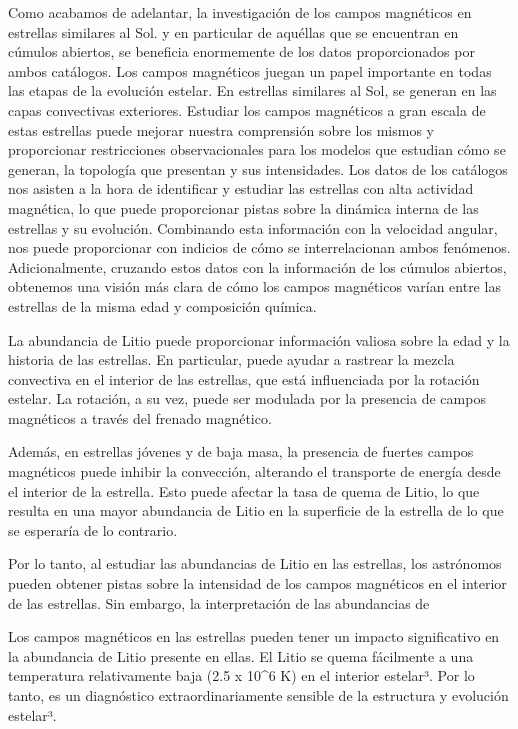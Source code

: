 Como acabamos de adelantar, la investigación de los campos magnéticos en estrellas similares al Sol. y en particular de aquéllas que se encuentran en cúmulos abiertos, se beneficia enormemente de los datos proporcionados por ambos catálogos. Los campos magnéticos juegan un papel importante en todas las etapas de la evolución estelar. En estrellas similares al Sol, se generan en las capas convectivas exteriores. Estudiar los campos magnéticos a gran escala de estas estrellas puede mejorar nuestra comprensión sobre los mismos y proporcionar restricciones observacionales para los modelos que estudian cómo se generan, la topología que presentan y sus intensidades. Los datos de los catálogos nos asisten a la hora de identificar y estudiar las estrellas con alta actividad magnética, lo que puede proporcionar pistas sobre la dinámica interna de las estrellas y su evolución. Combinando esta información con la velocidad angular, nos puede proporcionar con indicios de cómo se interrelacionan ambos fenómenos. Adicionalmente, cruzando estos datos con la información de los cúmulos abiertos, obtenemos una visión más clara de cómo los campos magnéticos varían entre las estrellas de la misma edad y composición química.\par




La abundancia de Litio puede proporcionar información valiosa sobre la edad y la historia de las estrellas. En particular, puede ayudar a rastrear la mezcla convectiva en el interior de las estrellas, que está influenciada por la rotación estelar. La rotación, a su vez, puede ser modulada por la presencia de campos magnéticos a través del frenado magnético.

Además, en estrellas jóvenes y de baja masa, la presencia de fuertes campos magnéticos puede inhibir la convección, alterando el transporte de energía desde el interior de la estrella. Esto puede afectar la tasa de quema de Litio, lo que resulta en una mayor abundancia de Litio en la superficie de la estrella de lo que se esperaría de lo contrario.

Por lo tanto, al estudiar las abundancias de Litio en las estrellas, los astrónomos pueden obtener pistas sobre la intensidad de los campos magnéticos en el interior de las estrellas. Sin embargo, la interpretación de las abundancias de

Los campos magnéticos en las estrellas pueden tener un impacto significativo en la abundancia de Litio presente en ellas. El Litio se quema fácilmente a una temperatura relativamente baja (2.5 x 10^6 K) en el interior estelar³. Por lo tanto, es un diagnóstico extraordinariamente sensible de la estructura y evolución estelar³.

